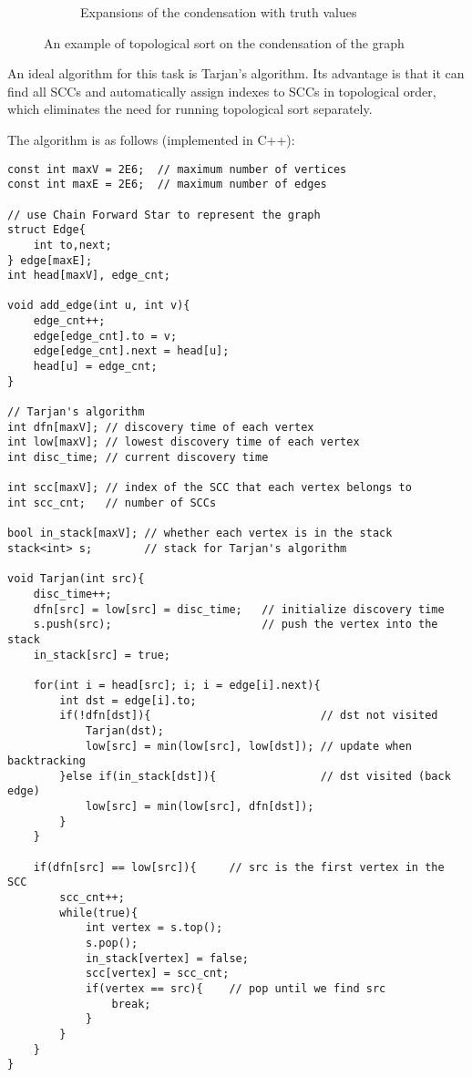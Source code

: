 \documentclass[a4paper,12pt]{article}
\begin{document}
\begin{figure}[H]
\begin{subfigure}[t]{0.5\linewidth}
{
		}
		\caption{Expansions of the condensation with truth values}
	\end{subfigure}
	\caption{An example of topological sort on the condensation of the graph}
\end{figure}

\vspace{0.5cm}

An ideal algorithm for this task is Tarjan's algorithm.
Its advantage is that it can find all SCCs and automatically assign indexes to SCCs in topological order, which eliminates the need for running topological sort separately.

The algorithm is as follows (implemented in C++):

\newpage
\begin{verbatim}
const int maxV = 2E6;  // maximum number of vertices
const int maxE = 2E6;  // maximum number of edges

// use Chain Forward Star to represent the graph
struct Edge{
    int to,next;
} edge[maxE];
int head[maxV], edge_cnt;

void add_edge(int u, int v){
    edge_cnt++;
    edge[edge_cnt].to = v;
    edge[edge_cnt].next = head[u];
    head[u] = edge_cnt;
}

// Tarjan's algorithm
int dfn[maxV]; // discovery time of each vertex
int low[maxV]; // lowest discovery time of each vertex
int disc_time; // current discovery time

int scc[maxV]; // index of the SCC that each vertex belongs to
int scc_cnt;   // number of SCCs

bool in_stack[maxV]; // whether each vertex is in the stack
stack<int> s;        // stack for Tarjan's algorithm

void Tarjan(int src){
    disc_time++;
    dfn[src] = low[src] = disc_time;   // initialize discovery time
    s.push(src);                       // push the vertex into the stack
    in_stack[src] = true; 

    for(int i = head[src]; i; i = edge[i].next){
        int dst = edge[i].to;
        if(!dfn[dst]){                          // dst not visited
            Tarjan(dst);
            low[src] = min(low[src], low[dst]); // update when backtracking
        }else if(in_stack[dst]){                // dst visited (back edge)
            low[src] = min(low[src], dfn[dst]); 
        }
    }

    if(dfn[src] == low[src]){     // src is the first vertex in the SCC
        scc_cnt++;
        while(true){
            int vertex = s.top();
            s.pop();
            in_stack[vertex] = false;
            scc[vertex] = scc_cnt;
            if(vertex == src){    // pop until we find src
                break;
            }
        }
    }
}
\end{verbatim}
\end{document}
